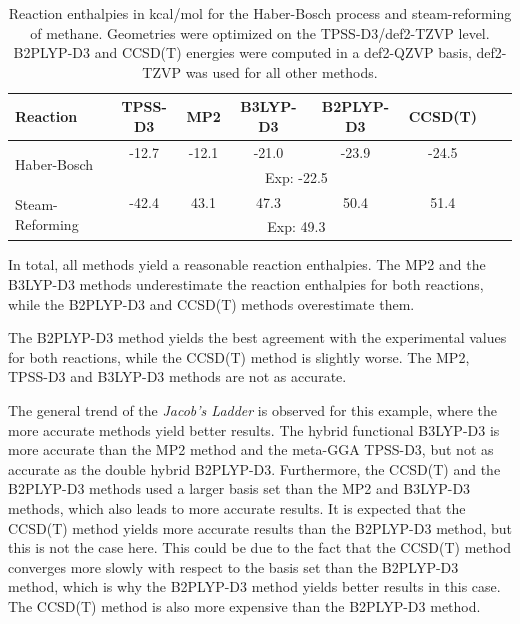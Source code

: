\documentclass[fontsize=11pt,a4paper,oneside]{scrartcl}
\begin{document}
\begin{table}[htbp]
    \centering
    \caption{Reaction enthalpies in kcal/mol for the Haber-Bosch process and steam-reforming of methane. Geometries were optimized on the \ac{TPSS}-D3/def2-TZVP level. \ac{B2PLYP}-D3 and \ac{CCSD(T)} energies were computed in a def2-QZVP basis, def2-TZVP was used for all other methods.}
    \label{tab:thermochemistry}
        \begin{tabular}{@{}lccccccc@{}} \toprule
        Reaction & \ac{TPSS}-D3 & \ac{MP2} & \ac{B3LYP}-D3 & \ac{B2PLYP}-D3 & \ac{CCSD(T)} \\ \midrule
        \multirow{2}{*}{Haber-Bosch} & -12.7 & -12.1 & -21.0 & -23.9 & -24.5 \\ \cmidrule{2-6}
        & \multicolumn{5}{c}{Exp\autocite{AKGrimme2025}: -22.5} \\ \midrule
        \multirow{2}{*}{Steam-Reforming} & -42.4 & 43.1 & 47.3 & 50.4 & 51.4 \\ \cmidrule{2-6}  
        & \multicolumn{5}{c}{Exp\autocite{AKGrimme2025}: 49.3} \\ \bottomrule
        \end{tabular}
\end{table}

In total, all methods yield a reasonable reaction enthalpies. The \ac{MP2} and the \ac{B3LYP}-D3 methods underestimate the reaction enthalpies for both reactions, while the \ac{B2PLYP}-D3 and \ac{CCSD(T)} methods overestimate them.

The \ac{B2PLYP}-D3 method yields the best agreement with the experimental values for both reactions, while the \ac{CCSD(T)} method is slightly worse. The \ac{MP2}, \ac{TPSS}-D3 and \ac{B3LYP}-D3 methods are not as accurate.

The general trend of the \textit{Jacob's Ladder} is observed for this example, where the more accurate methods yield better results. The hybrid functional \ac{B3LYP}-D3 is more accurate than the \ac{MP2} method and the meta-GGA \ac{TPSS}-D3, but not as accurate as the double hybrid \ac{B2PLYP}-D3. Furthermore, the \ac{CCSD(T)} and the \ac{B2PLYP}-D3 methods used a larger basis set than the \ac{MP2} and \ac{B3LYP}-D3 methods, which also leads to more accurate results. It is expected that the \ac{CCSD(T)} method yields more accurate results than the \ac{B2PLYP}-D3 method, but this is not the case here. This could be due to the fact that the \ac{CCSD(T)} method converges more slowly with respect to the basis set than the \ac{B2PLYP}-D3 method, which is why the \ac{B2PLYP}-D3 method yields better results in this case. The \ac{CCSD(T)} method is also more expensive than the \ac{B2PLYP}-D3 method.
\end{document}
